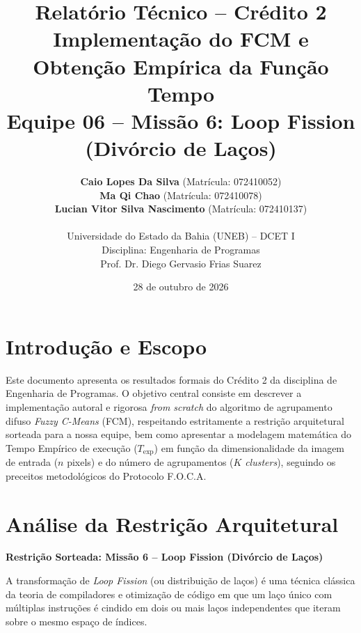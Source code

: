 \documentclass[11pt,a4paper]{article}
\title{\textbf{Relat\'{o}rio T\'{e}cnico -- Cr\'{e}dito 2}\\\large Implementa\c{c}\~{a}o do FCM e Obten\c{c}\~{a}o Emp\'{i}rica da Fun\c{c}\~{a}o Tempo\\\textbf{Equipe 06 -- Miss\~{a}o 6: Loop Fission (Div\'{o}rcio de La\c{c}os)}}
\author{
    \textbf{Caio Lopes Da Silva} (Matr\'{i}cula: 072410052) \\
    \textbf{Ma Qi Chao} (Matr\'{i}cula: 072410078) \\
    \textbf{Lucian Vitor Silva Nascimento} (Matr\'{i}cula: 072410137) \\
    \vspace{0.2cm}\\
    Universidade do Estado da Bahia (UNEB) -- DCET I \\
    Disciplina: Engenharia de Programas \\
    Prof. Dr. Diego Gervasio Frias Suarez
}
\date{28 de outubro de 2026}
\begin{document}
\maketitle

\section{Introdu\c{c}\~{a}o e Escopo}
Este documento apresenta os resultados formais do Cr\'{e}dito 2 da disciplina de Engenharia de Programas. O objetivo central consiste em descrever a implementa\c{c}\~{a}o autoral e rigorosa \textit{from scratch} do algoritmo de agrupamento difuso \textit{Fuzzy C-Means} (FCM), respeitando estritamente a restri\c{c}\~{a}o arquitetural sorteada para a nossa equipe, bem como apresentar a modelagem matem\'{a}tica do Tempo Emp\'{i}rico de execu\c{c}\~{a}o ($T_{\text{exp}}$) em fun\c{c}\~{a}o da dimensionalidade da imagem de entrada ($n$ pixels) e do n\'{u}mero de agrupamentos ($K$ \textit{clusters}), seguindo os preceitos metodol\'{o}gicos do Protocolo F.O.C.A.

\section{An\'{a}lise da Restri\c{c}\~{a}o Arquitetural}
\textbf{Restri\c{c}\~{a}o Sorteada: Miss\~{a}o 6 -- Loop Fission (Div\'{o}rcio de La\c{c}os)}

A transforma\c{c}\~{a}o de \textit{Loop Fission} (ou distribui\c{c}\~{a}o de la\c{c}os) \'{e} uma t\'{e}cnica cl\'{a}ssica da teoria de compiladores e otimiza\c{c}\~{a}o de c\'{o}digo em que um la\c{c}o \'{u}nico com m\'{u}ltiplas instru\c{c}\~{o}es \'{e} cindido em dois ou mais la\c{c}os independentes que iteram sobre o mesmo espa\c{c}o de \'{i}ndices.
\end{document}
